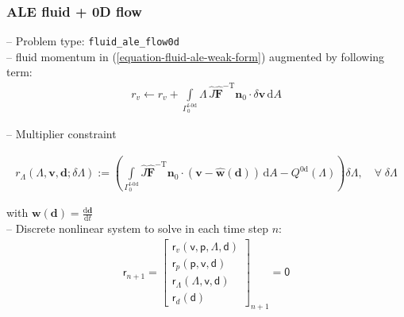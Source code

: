 \documentclass[a4paper,12pt]{report}
\newcommand{\fF}{\text{f}}
\newcommand{\bs}[1]{\boldsymbol{#1}}
\newcommand{\Gm}{\mathit{\Gamma}}
\newcommand{\ROP}{\bs{\mathsf{r}}}
\newcommand{\LMZ}{\bs{\mathsf{\Lambda}}}
\begin{document}
\subsubsection{ALE fluid + 0D flow}\label{ale-fluid-0d-flow}
-- Problem type: \verb"fluid_ale_flow0d"\\

-- fluid momentum in (\ref{equation-fluid-ale-weak-form}) augmented by following term:
\begin{equation}
\begin{aligned}
r_v \leftarrow r_v + \int\limits_{\Gm_0^{\fF\text{-}\mathrm{0d}}}\!\mathit{\Lambda}\,\widehat{J}\widehat{\bs{F}}^{-\mathrm{T}}\bs{n}_{0}\cdot\delta\bs{v}\,\mathrm{d}A
\end{aligned}
\end{equation}

-- Multiplier constraint

\begin{equation}
\begin{aligned}
r_{\mathit{\Lambda}}(\mathit{\Lambda},\bs{v},\bs{d};\delta\mathit{\Lambda}):= \left(\int\limits_{\Gm_0^{\mathrm{\fF\text{-}0d}}}\! \widehat{J}\widehat{\bs{F}}^{-\mathrm{T}}\bs{n}_{0}\cdot(\bs{v}-\widehat{\bs{w}}(\bs{d}))\,\mathrm{d}A - Q^{\mathrm{0d}}(\mathit{\Lambda})\right) \delta\mathit{\Lambda}, \quad \forall \; \delta\mathit{\Lambda}
\end{aligned}
\end{equation}

with $\bs{w}(\bs{d})=\frac{\mathrm{d}\bs{d}}{\mathrm{d}t}$\\

-- Discrete nonlinear system to solve in each time step $n$:
\begin{equation}
\label{equation-nonlin-sys-fluid-ale-0d}
\begin{aligned}
\ROP_{n+1} = \begin{bmatrix} \ROP_{v}(\bs{\mathsf{v}},\bs{\mathsf{p}},\LMZ,\bs{\mathsf{d}}) \\ \ROP_{p}(\bs{\mathsf{p}},\bs{\mathsf{v}},\bs{\mathsf{d}}) \\ \ROP_{\mathit{\Lambda}}(\LMZ,\bs{\mathsf{v}},\bs{\mathsf{d}}) \\ \ROP_{d}(\bs{\mathsf{d}}) \end{bmatrix}_{n+1} = \bs{\mathsf{0}}
\end{aligned}
\end{equation}
\end{document}

